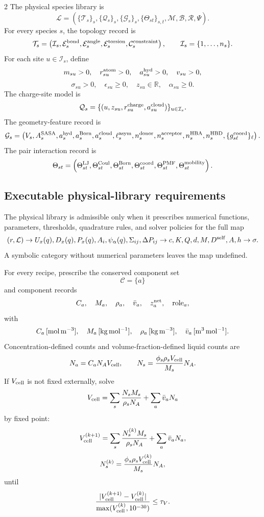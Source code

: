 \documentclass[10pt]{article}
\newcommand{\R}{\mathbb{R}}
\begin{document}
\begin{multicols}{2}
The physical species library is
\[
\mathcal L=
\left(
\{\mathcal T_s\}_s,
\{\mathcal Q_s\}_s,
\{\mathcal G_s\}_s,
\{\Theta_{st}\}_{s,t},
\mathcal M,
\mathcal B,
\mathcal R,
\Psi
\right).
\]
For every species \(s\), the topology record is
\[
\mathcal T_s=
\left(
\mathcal I_s,
\mathcal E_s^{\rm bond},
\mathcal E_s^{\rm angle},
\mathcal E_s^{\rm torsion},
\mathcal C_s^{\rm constraint}
\right),
\qquad
\mathcal I_s=\{1,\ldots,n_s\}.
\]
For each site \(u\in\mathcal I_s\), define
\[
m_{su}>0,\quad r_{su}^{\rm atom}>0,\quad
a_{su}^{\rm hyd}>0,\quad v_{su}>0,
\]
\[
\sigma_{su}>0,\quad \epsilon_{su}\ge0,\quad
z_{su}\in\R,\quad \alpha_{su}\ge0.
\]
The charge-site model is
\[
\mathcal Q_s=
\{(u,z_{su},r_{su}^{\rm charge},a_{su}^{\rm cloud})\}_{u\in\mathcal I_s}.
\]
The geometry-feature record is
\[
\mathcal G_s=
\left(
V_s,A_s^{\rm SASA},a_s^{\rm hyd},a_s^{\rm Born},
a_s^{\rm cloud},\ell_s^{\rm asym},
n_s^{\rm donor},n_s^{\rm acceptor},
n_s^{\rm HBA},n_s^{\rm HBD},
\{g_{s\ell}^{\rm coord}\}_{\ell}
\right).
\]
The pair interaction record is
\[
\Theta_{st}=
\left(
\Theta_{st}^{\rm LJ},
\Theta_{st}^{\rm Coul},
\Theta_{st}^{\rm Born},
\Theta_{st}^{\rm coord},
\Theta_{st}^{\rm PMF},
\Theta_{st}^{\rm mobility}
\right).
\]

\subsection{Executable physical-library requirements}

The physical library is admissible only when it prescribes numerical functions,
parameters, thresholds, quadrature rules, and solver policies for the full map
\[
(r,\mathcal L)
\rightarrow
U_x(q),D_x(q),P_x(q),A_i,\psi_\alpha(q),\Sigma_{ij},\Delta P_{ij}
\rightarrow
c,K,Q,d,M,D^{\rm self},A,h
\rightarrow
\sigma.
\]
A symbolic category without numerical parameters leaves the map undefined.

For every recipe, prescribe the conserved component set
\[
\mathcal C=\{a\}
\]
and component records
\[
C_a,\quad M_a,\quad \rho_a,\quad \bar v_a,\quad z_a^{\rm net},
\quad {\rm role}_a,
\]
with
\[
C_a\,[{\rm mol\,m^{-3}}],
\quad
M_a\,[{\rm kg\,mol^{-1}}],
\quad
\rho_a\,[{\rm kg\,m^{-3}}],
\quad
\bar v_a\,[{\rm m^3\,mol^{-1}}].
\]
Concentration-defined counts and volume-fraction-defined liquid counts are
\[
N_a=C_aN_AV_{\rm cell},
\qquad
N_s=\frac{\phi_s\rho_sV_{\rm cell}}{M_s}N_A.
\]
If \(V_{\rm cell}\) is not fixed externally, solve
\[
V_{\rm cell}
=
\sum_s\frac{N_sM_s}{\rho_sN_A}
+
\sum_a\bar v_aN_a
\]
by fixed point:
\[
V_{\rm cell}^{(k+1)}
=
\sum_s\frac{N_s^{(k)}M_s}{\rho_sN_A}
+
\sum_a\bar v_aN_a,
\]
\[
N_s^{(k)}
=
\frac{\phi_s\rho_sV_{\rm cell}^{(k)}}{M_s}N_A,
\]
until
\[
\frac{|V_{\rm cell}^{(k+1)}-V_{\rm cell}^{(k)}|}
{\max(V_{\rm cell}^{(k)},10^{-30})}
\le\tau_V.
\]


\end{multicols}
\end{document}
